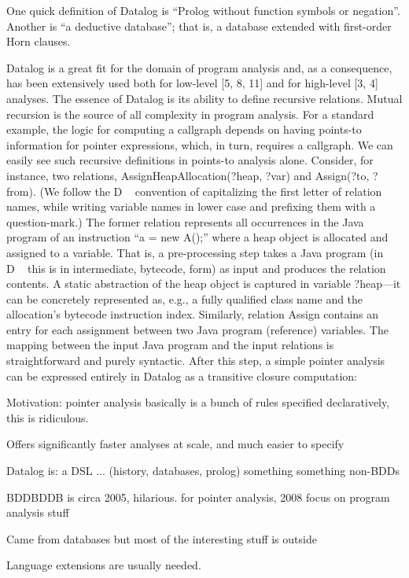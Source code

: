 \documentclass[11pt]{article}
\begin{document}
One quick definition of Datalog is “Prolog without function symbols or
negation”. Another is “a deductive database”; that is, a database extended with
first-order Horn clauses.

\iffalse 
Datalog is a great fit for the domain of program analysis and, as a consequence,
has been extensively used both for low-level [5, 8, 11] and for high-level [3, 4] analyses. The essence of Datalog is its ability to define recursive relations. Mutual recursion is the source of all complexity in program analysis. For a standard example, the logic for computing a callgraph depends on having points-to information for
pointer expressions, which, in turn, requires a callgraph. We can easily see such recursive definitions in points-to analysis alone. Consider, for instance, two relations,
AssignHeapAllocation(?heap, ?var) and Assign(?to, ?from). (We follow the D
convention of capitalizing the first letter of relation names, while writing variable names
in lower case and prefixing them with a question-mark.) The former relation represents
all occurrences in the Java program of an instruction “a = new A();” where a heap object is allocated and assigned to a variable. That is, a pre-processing step takes a Java
program (in D this is in intermediate, bytecode, form) as input and produces the relation contents. A static abstraction of the heap object is captured in variable ?heap—it
can be concretely represented as, e.g., a fully qualified class name and the allocation’s
bytecode instruction index. Similarly, relation Assign contains an entry for each assignment between two Java program (reference) variables.
The mapping between the input Java program and the input relations is straightforward and purely syntactic. After this step, a simple pointer analysis can be expressed
entirely in Datalog as a transitive closure computation:


Motivation: pointer analysis basically is a bunch of rules specified
declaratively, this is ridiculous. 

Offers significantly faster analyses at scale, and much easier to specify

Datalog is: a DSL ... (history, databases, prolog)
something something non-BDDs



BDDBDDB is circa 2005, hilarious.
for pointer analysis, 2008
focus on program analysis stuff

Came from databases but most of the interesting stuff is outside

Language extensions are usually needed. 
\end{document}
